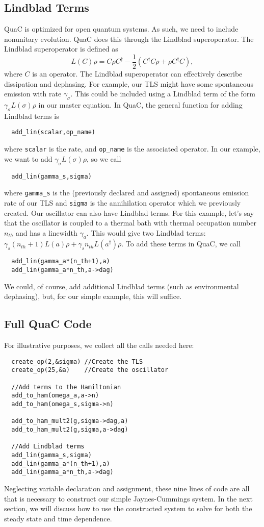 \documentclass{article}
\begin{document}
\subsection{Lindblad Terms}
QuaC is optimized for open quantum systems. As such, we need to 
include nonunitary evolution. QuaC does this
through the Lindblad superoperator. The Lindblad superoperator is defined as
\begin{equation}
  L(C)\rho = C\rho C^\dagger - \frac{1}{2}(C^\dagger C \rho + \rho C^\dagger C),
\end{equation}
where $C$ is an operator. The Lindblad superoperator can effectively describe
dissipation and dephasing. For example, our TLS might have some spontaneous emission
with rate $\gamma_\sigma$. This could be included using a Lindblad term of
the form $\gamma_\sigma L(\sigma)\rho$ in our master equation. In QuaC, the general
function for adding Lindblad terms is
\begin{lstlisting}
  add_lin(scalar,op_name)
\end{lstlisting}
where \texttt{scalar} is the rate, and \texttt{op\_name} is the associated operator. In our example,
we want to add $\gamma_\sigma L(\sigma)\rho$, so we call
\begin{lstlisting}
  add_lin(gamma_s,sigma)
\end{lstlisting}
where \texttt{gamma\_s} is the (previously declared and assigned) spontaneous emission rate
of our TLS and \texttt{sigma} is the annihilation operator which we previously created.
Our oscillator can also have Lindblad terms. For this example, let's say that the oscillator
is coupled to a thermal bath with thermal occupation number $n_{th}$ and has a linewidth
$\gamma_a$. This would give two Lindblad terms:
$\gamma_s (n_{th} + 1) L(a)\rho + \gamma_s n_{th} L(a^\dagger)\rho$. To add these terms in
QuaC, we call
\begin{lstlisting}
  add_lin(gamma_a*(n_th+1),a)
  add_lin(gamma_a*n_th,a->dag)
\end{lstlisting}
We could, of course, add additional Lindblad terms (such as environmental dephasing), but,
for our simple example, this will suffice.
\subsection{Full QuaC Code}
  For illustrative purposes, we collect
all the calls needed here:
\begin{lstlisting}
  create_op(2,&sigma) //Create the TLS
  create_op(25,&a)    //Create the oscillator

  //Add terms to the Hamiltonian
  add_to_ham(omega_a,a->n)      
  add_to_ham(omega_s,sigma->n)
 
  add_to_ham_mult2(g,sigma->dag,a)
  add_to_ham_mult2(g,sigma,a->dag)

  //Add Lindblad terms
  add_lin(gamma_s,sigma)
  add_lin(gamma_a*(n_th+1),a)
  add_lin(gamma_a*n_th,a->dag)
\end{lstlisting}
Neglecting variable declaration and assignment, these nine lines of code are all that is necessary
to construct our simple Jaynes-Cummings system. In the next section, we will discuss
how to use the constructed system to solve for both the steady state and time dependence.
\end{document}
